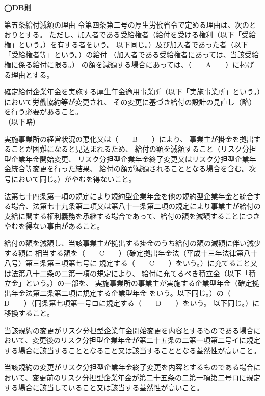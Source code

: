 \begin{fillblank}[数理人試験 \ 2019 \ 問題4 \ 設問1]
  \noindent \textbf{◯DB則}
  \begin{lawstructure}
    \begin{lawarticle}{第五条}{給付減額の理由}
        令第四条第二号の厚生労働省令で定める理由は、次のとおりとする。
        ただし、加入者である受給権者（給付を受ける権利（以下「受給権」という。）を有する者をいう。
        以下同じ。）及び加入者であった者（以下「受給権者等」という。）の給付
        （加入者である受給権者にあっては、当該受給権に係る給付に限る。）
        の額を減額する場合にあっては、（　　A　　）に掲げる理由とする。

        確定給付企業年金を実施する厚生年金適用事業所（以下「実施事業所」という。）において労働協約等が変更され、
        その変更に基づき給付の設計の見直し（略）を行う必要があること。\\
        （以下略）

        実施事業所の経営状況の悪化又は（　　B　　）により、
        事業主が掛金を拠出することが困難になると見込まれるため、
        給付の額を減額すること（リスク分担型企業年金開始変更、
        リスク分担型企業年金終了変更又はリスク分担型企業年金統合等変更を行った結果、
        給付の額が減額されることとなる場合を含む。次号において同じ。）がやむを得ないこと。

        法第七十四条第一項の規定により規約型企業年金を他の規約型企業年金と統合する場合、法第七十九条第二項又は第八十一条第二項の規定により事業主が給付の支給に関する権利義務を承継する場合であって、給付の額を減額することにつきやむを得ない事由があること。

        給付の額を減額し、当該事業主が拠出する掛金のうち給付の額の減額に伴い減少する額に
        相当する額を（　　C　　）（確定拠出年金法（平成十三年法律第八十八号）第三条第三項第七号に
        規定する（　　C　　）をいう。）に充てること又は法第八十二条の二第一項の規定により、
        給付に充てるべき積立金（以下「積立金」という。）の一部を、
        実施事業所の事業主が実施する企業型年金（確定拠出年金法第二条第二項に規定する企業型年金
        をいう。以下同じ。）の（　　D　　）（同条第七項第一号ロに規定する（　　D　　）をいう。
        以下同じ。）に移換すること。

        当該規約の変更がリスク分担型企業年金開始変更を内容とするものである場合において、変更後のリスク分担型企業年金が第二十五条の二第一項第二号イに規定する場合に該当することとなること又は該当することとなる蓋然性が高いこと。

        当該規約の変更がリスク分担型企業年金終了変更を内容とするものである場合において、変更前のリスク分担型企業年金が第二十五条の二第一項第二号ロに規定する場合に該当していること又は該当する蓋然性が高いこと。
    \end{lawarticle}
  \end{lawstructure}
\end{fillblank}

